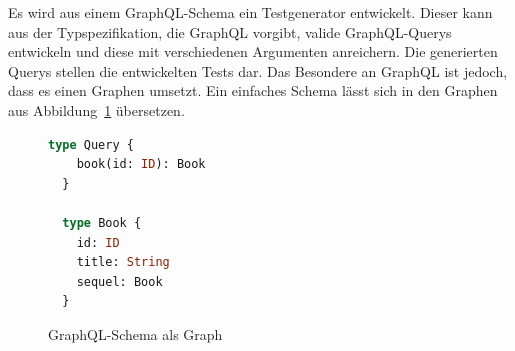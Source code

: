Es wird aus einem GraphQL-Schema ein Testgenerator entwickelt.
Dieser kann aus der Typspezifikation, die GraphQL vorgibt, valide GraphQL-Querys entwickeln und diese mit verschiedenen Argumenten anreichern.
Die generierten Querys stellen die entwickelten Tests dar.
Das Besondere an GraphQL ist jedoch, dass es einen Graphen umsetzt.
Ein einfaches Schema lässt sich in den Graphen aus Abbildung~\ref{schemgg} übersetzen.

\begin{figure}[h!]
    \centering
    \begin{minipage}{0.45\textwidth}
        \begin{lstlisting}[language=GraphQL]
  type Query {
    book(id: ID): Book
  }

  type Book {
    id: ID
    title: String
    sequel: Book
  }
        \end{lstlisting}
    \end{minipage}
    \hfill %
    \begin{minipage}{0.45\textwidth}
    \end{minipage}
    \caption{GraphQL-Schema als Graph}
    \label{schemgg}
\end{figure}

